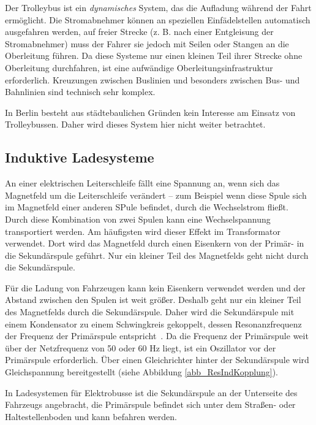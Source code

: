 Der Trolleybus ist ein \emph{dynamisches} System, das die Aufladung während der Fahrt ermöglicht. Die Stromabnehmer können an speziellen Einfädelstellen automatisch ausgefahren werden, auf freier Strecke (z. B. nach einer Entgleisung der Stromabnehmer) muss der Fahrer sie jedoch mit Seilen oder Stangen an die Oberleitung führen. Da diese Systeme nur einen kleinen Teil ihrer Strecke ohne Oberleitung durchfahren, ist eine aufwändige Oberleitungsinfrastruktur erforderlich. Kreuzungen zwischen Buslinien und besonders zwischen Bus- und Bahnlinien sind technisch sehr komplex.

In Berlin besteht aus städtebaulichen Gründen kein Interesse am Einsatz von Trolleybussen. Daher wird dieses System hier nicht weiter betrachtet.
                                 
\subsection{Induktive Ladesysteme}
An einer elektrischen Leiterschleife fällt eine Spannung an, wenn sich das Magnetfeld um die Leiterschleife verändert – zum Beispiel wenn diese Spule sich im Magnetfeld einer anderen SPule befindet, durch die Wechselstrom fließt. Durch diese Kombination von zwei Spulen kann eine Wechselspannung transportiert werden. Am häufigsten wird dieser Effekt im Transformator verwendet. Dort wird das Magnetfeld durch einen Eisenkern von der Primär- in die Sekundärspule geführt. Nur ein kleiner Teil des Magnetfelds geht nicht durch die Sekundärspule.

Für die Ladung von Fahrzeugen kann kein Eisenkern verwendet werden und der Abstand zwischen den Spulen ist weit größer. Deshalb geht nur ein kleiner Teil des Magnetfelds durch die Sekundärspule. Daher wird die Sekundärspule mit einem Kondensator zu einem Schwingkreis gekoppelt, dessen Resonanzfrequenz der Frequenz der Primärspule entspricht~\cite{Kurs06072007}. Da die Frequenz der Primärspule weit über der Netzfrequenz von 50 oder 60 Hz liegt, ist ein Oszillator vor der Primärspule erforderlich. Über einen Gleichrichter hinter der Sekundärspule wird Gleichspannung bereitgestellt (siehe Abbildung \ref{abb_ResIndKopplung}).

In Ladesystemen für Elektrobusse ist die Sekundärspule an der Unterseite des Fahrzeugs angebracht, die Primärspule befindet sich unter dem Straßen- oder Haltestellenboden und kann befahren werden.



